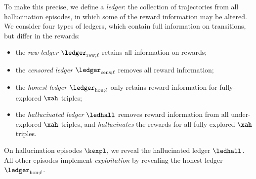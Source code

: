 
To make this precise, we define a \emph{ledger}: the collection of trajectories from all  hallucination episodes, in which some of the reward information may be altered. We consider four types of ledgers, which contain full information on transitions, but differ in the rewards:
\begin{itemize}
\item the \emph{raw ledger} $\ledrawl$ retains all information on rewards;
\item the \emph{censored ledger} $\ledcensl$ removes all reward information;
\item the \emph{honest ledger} $\ledhonl$
 only retains reward information for fully-explored $\xah$ triples;
\item the \emph{hallucinated ledger} $\ledhall$
     removes reward information from all under-explored $\xah$ triples,
    and \emph{hallucinates} the rewards for all fully-explored $\xah$ triples.
\end{itemize}



\noindent On hallucination episodes $\kexpl$, we reveal the hallucinated ledger $\ledhall$. All other episodes implement \emph{exploitation} by revealing the honest ledger $\ledhonl$.

